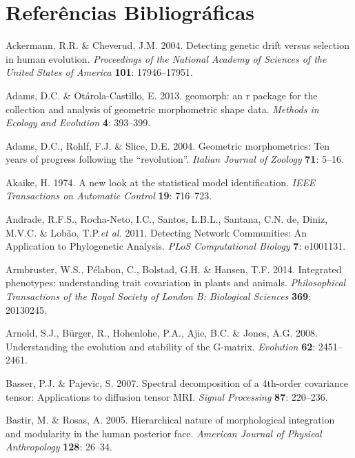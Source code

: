 \documentclass[12pt,twoside]{report}
\begin{document}
\def\sectionautorefname{Seção} \def\chapterautorefname{Capítulo}
\def\figureautorefname{Figura} \def\tableautorefname{Tabela}


\pagestyle{plain}

\chapter*{Referências Bibliográficas}


Ackermann, R.R. \& Cheverud, J.M. 2004. Detecting genetic drift versus
selection in human evolution. \emph{Proceedings of the National Academy
of Sciences of the United States of America} \textbf{101}: 17946--17951.

Adams, D.C. \& Otárola-Castillo, E. 2013. geomorph: an r package for the
collection and analysis of geometric morphometric shape data.
\emph{Methods in Ecology and Evolution} \textbf{4}: 393--399.

Adams, D.C., Rohlf, F.J. \& Slice, D.E. 2004. Geometric morphometrics:
Ten years of progress following the ``revolution''. \emph{Italian
Journal of Zoology} \textbf{71}: 5--16.

Akaike, H. 1974. A new look at the statistical model identification.
\emph{IEEE Transactions on Automatic Control} \textbf{19}: 716--723.

Andrade, R.F.S., Rocha-Neto, I.C., Santos, L.B.L., Santana, C.N. de,
Diniz, M.V.C. \& Lobão, T.P.\emph{et al.} 2011. Detecting Network
Communities: An Application to Phylogenetic Analysis. \emph{PLoS
Computational Biology} \textbf{7}: e1001131.

Armbruster, W.S., Pélabon, C., Bolstad, G.H. \& Hansen, T.F. 2014.
Integrated phenotypes: understanding trait covariation in plants and
animals. \emph{Philosophical Transactions of the Royal Society of London
B: Biological Sciences} \textbf{369}: 20130245.

Arnold, S.J., Bürger, R., Hohenlohe, P.A., Ajie, B.C. \& Jones, A.G.
2008. Understanding the evolution and stability of the G-matrix.
\emph{Evolution} \textbf{62}: 2451--2461.

Basser, P.J. \& Pajevic, S. 2007. Spectral decomposition of a 4th-order
covariance tensor: Applications to diffusion tensor MRI. \emph{Signal
Processing} \textbf{87}: 220--236.

Bastir, M. \& Rosas, A. 2005. Hierarchical nature of morphological
integration and modularity in the human posterior face. \emph{American
Journal of Physical Anthropology} \textbf{128}: 26--34.
\end{document}
